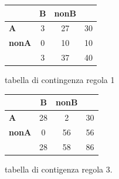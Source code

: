 \documentclass[a4paper,9pt]{article}
\begin{document}
\begin{figure}[H]
  \centering
  \begin{minipage}{.45\textwidth}
    \centering
    \begin{tabular}{l|cc|r}
& \bfseries B & \bfseries nonB &\\
\hline
\bfseries A & 3 & 27 &30\\
\bfseries nonA & 0&10&10\\
\hline
& 3&37&40\\
\end{tabular}
    \caption{tabella di contingenza regola 1}
  \end{minipage}
  \begin{minipage}{.45\textwidth}
    \centering
    \begin{tabular}{l|cc|r}
& \bfseries B & \bfseries nonB &\\
\hline
\bfseries A & 28& 2 &30\\
\bfseries nonA & 0&56&56\\
\hline
& 28&58&86\\
\end{tabular}
    \caption{tabella di contigenza regola 3.}
  \end{minipage}
  \end{figure}



\end{document}
